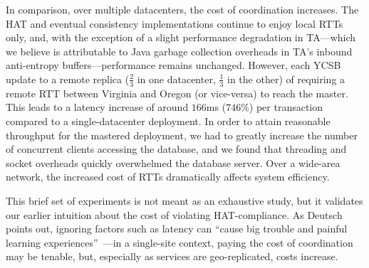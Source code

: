 In comparison, over multiple datacenters, the cost of coordination
increases. The HAT and eventual consistency implementations continue
to enjoy local RTTs only, and, with the exception of a slight
performance degradation in TA---which we believe is attributable to
Java garbage collection overheads in TA's inbound anti-entropy
buffers---performance remains unchanged. However, each YCSB update to
a remote replica ($\frac{2}{3}$ in one datacenter, $\frac{1}{3}$ in
the other) of requiring a remote RTT between Virginia and Oregon (or
vice-versa) to reach the master. This leads to a latency increase of
around $166$ms ($746\%$) per transaction compared to a
single-datacenter deployment. In order to attain reasonable throughput
for the mastered deployment, we had to greatly increase the number of
concurrent clients accessing the database, and we found that threading
and socket overheads quickly overwhelmed the database server. Over a
wide-area network, the increased cost of RTTs dramatically affects
system efficiency.

This brief set of experiments is not meant as an exhaustive study, but
it validates our earlier intuition about the cost of violating
HAT-compliance. As Deutsch points out, ignoring factors such as
latency can ``cause big trouble and painful learning
experiences''~\cite{fallacies-deutsch}---in a single-site context,
paying the cost of coordination may be tenable, but, especially as
services are geo-replicated,  costs increase. 
